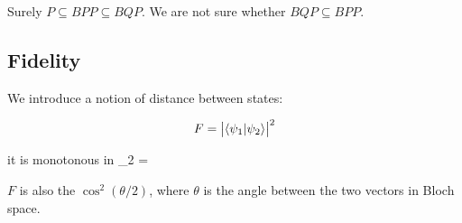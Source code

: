 \documentclass[main.tex]{subfiles}
\begin{document}
Surely \(P \subseteq BPP \subseteq BQP\). We are not sure whether \(BQP \subseteq BPP\).

\subsection{Fidelity}

We introduce a notion of distance between states:

\begin{equation}
    F = \abs{\braket{\psi_1}{\psi_2} }^2
\end{equation}

it is monotonous in _2 = \)

\(F\) is also the \(\cos^2(\theta/2) \), where \(\theta\) is the angle between the two vectors in Bloch space.
\end{document}
